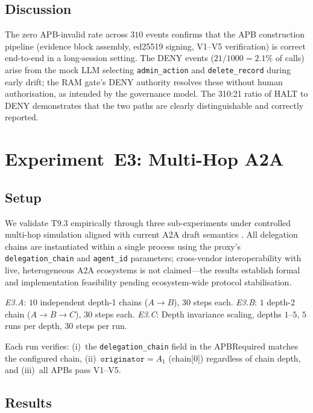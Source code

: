 \documentclass[11pt]{article}
\begin{document}
\subsection{Discussion}

The zero APB-invalid rate across $310$ events confirms that the APB
construction pipeline (evidence block assembly, ed25519 signing,
V1--V5 verification) is correct end-to-end in a long-session setting.
The DENY events ($21/1000 = 2.1\%$ of calls) arise from the mock LLM
selecting \texttt{admin\_action} and \texttt{delete\_record} during
early drift; the RAM gate's DENY authority resolves these without
human authorisation, as intended by the governance model.
The 310:21 ratio of HALT to DENY demonstrates that the two paths
are clearly distinguishable and correctly reported.

\section{Experiment~E3: Multi-Hop A2A}
\label{sec:exp3}

\subsection{Setup}

We validate T9.3 empirically through three sub-experiments under
controlled multi-hop simulation aligned with current A2A draft
semantics \citep{google2025a2a}. All delegation chains are
instantiated within a single process using the proxy's
\texttt{delegation\_chain} and \texttt{agent\_id} parameters;
cross-vendor interoperability with live, heterogeneous A2A
ecosystems is not claimed---the results establish formal and
implementation feasibility pending ecosystem-wide protocol
stabilisation.

\emph{E3.A}: $10$ independent depth-1 chains ($A \to B$), $30$ steps each.
\emph{E3.B}: $1$ depth-2 chain ($A \to B \to C$), $30$ steps each.
\emph{E3.C}: Depth invariance scaling, depths $1$--$5$, $5$ runs per depth,
$30$ steps per run.

Each run verifies: (i)~the \texttt{delegation\_chain} field in the
APBRequired matches the configured chain, (ii)~$\texttt{originator} = A_1$
(chain[0]) regardless of chain depth, and (iii)~all APBs pass V1--V5.

\subsection{Results}
\end{document}
